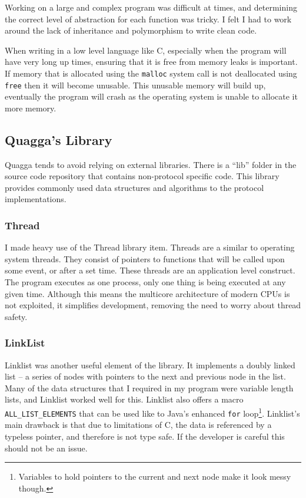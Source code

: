 \documentclass[12pt,a4paper,twoside]{report}
\begin{document}
Working on a large and complex program was difficult at times, and determining
the correct level of abstraction for each function was tricky.  I felt I had to
work around the lack of inheritance and polymorphism to write clean code. 

When writing in a low level language like C, especially when the program will
have very long up times, ensuring that it is free from memory leaks is
important. If memory that is allocated using the \texttt{malloc} system call is
not deallocated using \texttt{free} then it will become unusable. This unusable
memory will build up, eventually the program will crash as the operating system
is unable to allocate it more memory.

\subsection{Quagga's Library}
Quagga tends to avoid relying on external libraries. There is a ``lib'' folder
in the source code repository that contains non-protocol specific code. This
library provides commonly used data structures and algorithms to the protocol
implementations. 

\subsubsection{Thread}
I made heavy use of the Thread library item. Threads are a similar to
operating system threads. They consist of pointers to functions that will be
called upon some event, or after a set time. These threads are an application
level construct. The program  executes as one process, only one thing is
being executed at any given time. Although this means the multicore
architecture of modern CPUs  is not
exploited, it simplifies development, removing the need to worry about thread
safety.

\subsubsection{LinkList}
Linklist was another useful element of the library. It implements a doubly
linked list -- a series of nodes with pointers to the next and previous node in
the list. Many of the data structures that I required in my program were
variable length lists, and Linklist worked well for this. Linklist also offers
a macro \texttt{ALL\_LIST\_ELEMENTS} that can be used like to Java's enhanced
\texttt{for} loop\footnote{Variables to hold pointers to the current and next
node make it look messy though.}. Linklist's main drawback is that due to
limitations of C, the data is referenced by a typeless pointer, and therefore
is not type safe. If the developer is careful this should not be an issue. 
\end{document}
